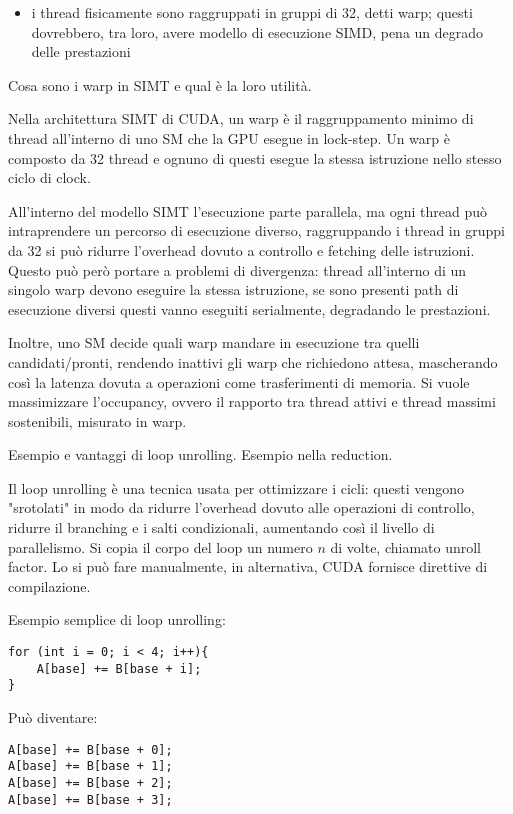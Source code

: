 \begin{questions}
\begin{solution}
\begin{itemize}
    		\item i thread fisicamente sono raggruppati in gruppi di 32, detti warp; questi dovrebbero, tra loro, avere modello di esecuzione SIMD, pena un degrado delle prestazioni 
    	\end{itemize}
    \end{solution}
    
    \question Cosa sono i warp in SIMT e qual è la loro utilità.
    
    \begin{solution}
    	Nella architettura SIMT di CUDA, un warp è il raggruppamento minimo di thread all'interno di uno SM che la GPU esegue in lock-step. Un warp è composto da 32 thread e ognuno di questi esegue la stessa istruzione nello stesso ciclo di clock. 
    	
    	All'interno del modello SIMT l'esecuzione parte parallela, ma ogni thread può intraprendere un percorso di esecuzione diverso, raggruppando i thread in gruppi da 32 si può ridurre l'overhead dovuto a controllo e fetching delle istruzioni. Questo può però portare a problemi di divergenza: thread all'interno di un singolo warp devono eseguire la stessa istruzione, se sono presenti path di esecuzione diversi questi vanno eseguiti serialmente, degradando le prestazioni.
    	
    	Inoltre, uno SM decide quali warp mandare in esecuzione tra quelli candidati/pronti, rendendo inattivi gli warp che richiedono attesa, mascherando così la latenza dovuta a operazioni come trasferimenti di memoria. Si vuole massimizzare l'occupancy, ovvero il rapporto tra thread attivi e thread massimi sostenibili, misurato in warp. 
    \end{solution}
    
    \question Esempio e vantaggi di loop unrolling. Esempio nella reduction.
    
    \begin{solution}
    	Il loop unrolling è una tecnica usata per ottimizzare i cicli: questi vengono "srotolati" in modo da ridurre l'overhead dovuto alle operazioni di controllo, ridurre il branching e i salti condizionali, aumentando così il livello di parallelismo. Si copia il corpo del loop un numero $n$ di volte, chiamato unroll factor. Lo si può fare manualmente, in alternativa, CUDA fornisce direttive di compilazione.
    	
    	Esempio semplice di loop unrolling: 
    	\begin{verbatim}
for (int i = 0; i < 4; i++){
    A[base] += B[base + i];
}
    	\end{verbatim}
    	Può diventare:
    	\begin{verbatim}
A[base] += B[base + 0];
A[base] += B[base + 1];
A[base] += B[base + 2];
A[base] += B[base + 3];
    	\end{verbatim}
    	

\end{solution}
\end{questions}
